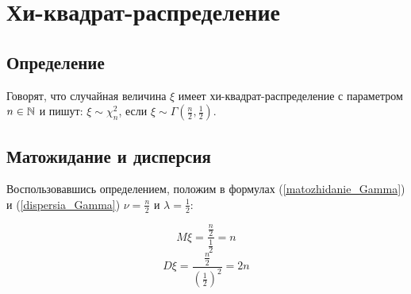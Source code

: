 \section{Хи-квадрат-распределение}

\subsection{Определение}
Говорят, что случайная величина $\xi$ имеет хи-квадрат-распределение с параметром $n\in\mathbb{N}$ и пишут: $\xi \sim \chi^2_n$, если $\xi \sim \Gamma(\frac{n}{2},\frac{1}{2})$.

\subsection{Матожидание и дисперсия}
Воспользовавшись определением, положим в формулах (\ref{matozhidanie_Gamma}) и (\ref{dispersia_Gamma}) $\nu=\frac{n}{2}$ и $\lambda=\frac{1}{2}$:

\begin{equation}
M\xi = 
\frac{\frac{n}{2}}{\frac{1}{2}} =
n
\end{equation}
\begin{equation}
D\xi = 
\frac{\frac{n}{2}}{\left(\frac{1}{2}\right)^2} =
2n
\end{equation}

